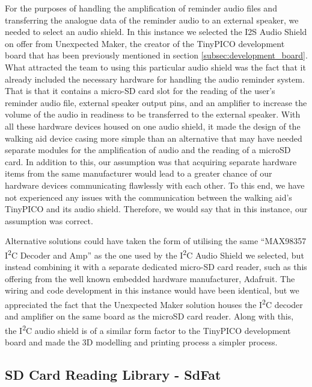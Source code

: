             For the purposes of handling the amplification of reminder audio files and transferring the analogue data of the reminder audio to an external speaker, we needed to select an audio shield. In this instance we selected the I2S Audio Shield \cite{unexpected_maker} on offer from Unexpected Maker, the creator of the TinyPICO development board that has been previously mentioned in section \ref{subsec:development_board}. What attracted the team to using this particular audio shield was the fact that it already included the necessary hardware for handling the audio reminder system. That is that it contains a micro-SD card slot for the reading of the user's reminder audio file, external speaker output pins, and an amplifier to increase the volume of the audio in readiness to be transferred to the external speaker. With all these hardware devices housed on one audio shield, it made the design of the walking aid device casing more simple than an alternative that may have needed separate modules for the amplification of audio and the reading of a microSD card. In addition to this, our assumption was that acquiring separate hardware items from the same manufacturer would lead to a greater chance of our hardware devices communicating flawlessly with each other. To this end, we have not experienced any issues with the communication between the walking aid's TinyPICO and its audio shield. Therefore, we would say that in this instance, our assumption was correct.
            
            Alternative solutions could have taken the form of utilising the same ``MAX98357 I\textsuperscript{2}C Decoder and Amp'' \cite{unexpected_maker} as the one used by the I\textsuperscript{2}C Audio Shield we selected, but instead combining it with a separate dedicated micro-SD card reader, such as this offering \cite{ada_2022} from the well known embedded hardware manufacturer, Adafruit. The wiring and code development in this instance would have been identical, but we appreciated the fact that the Unexpected Maker solution houses the I\textsuperscript{2}C decoder and amplifier on the same board as the microSD card reader. Along with this, the I\textsuperscript{2}C audio shield is of a similar form factor to the TinyPICO development board and made the 3D modelling and printing process a simpler process.

        \subsection{SD Card Reading Library - SdFat}
        \label{subsec:sdfat}

